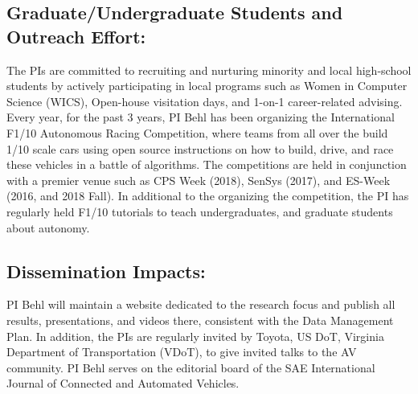 \subsection{Graduate/Undergraduate Students and Outreach Effort:}
The PIs are committed to recruiting and nurturing minority and local high-school students by actively participating in local programs such as Women in Computer Science (WICS),  Open-house visitation days, and 1-on-1 career-related advising.
Every year, for the past 3 years, PI Behl has been organizing the International F1/10 Autonomous Racing Competition, where teams from all over the build 1/10 scale cars using open source instructions on how to build, drive, and race these vehicles in a battle of algorithms. The competitions are held in conjunction with a premier venue such as CPS Week (2018), SenSys (2017), and ES-Week (2016, and 2018 Fall). In additional to the organizing the competition, the PI has regularly held F1/10 tutorials to teach undergraduates, and graduate students about autonomy.  

\subsection{Dissemination Impacts:}
PI Behl will maintain a website dedicated to the research focus and publish all results, presentations, and videos there, consistent with the Data Management Plan. 
In addition, the PIs are regularly invited by Toyota, US DoT, Virginia Department of Transportation (VDoT), to give invited talks to the AV community.
PI Behl serves on the editorial board of the SAE International Journal of Connected and Automated Vehicles.